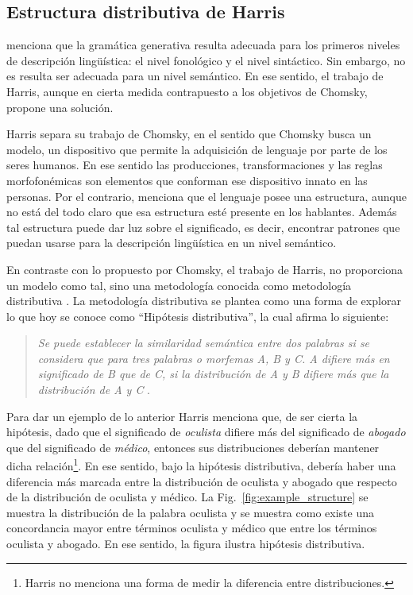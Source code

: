 \subsection{Estructura distributiva de Harris}

\cite{chomsky1997problemas} menciona que la gramática generativa resulta adecuada para los primeros niveles de descripción lingüística: el nivel fonológico y el nivel sintáctico. Sin embargo, no es resulta ser adecuada para un nivel semántico. En ese sentido, el trabajo de Harris, aunque en cierta medida contrapuesto a los objetivos de Chomsky, propone una solución.

Harris separa su trabajo de Chomsky, en el sentido que Chomsky busca un modelo, un dispositivo que permite la adquisición de lenguaje por parte de los seres humanos. En ese sentido las producciones, transformaciones y las reglas morfofonémicas son elementos que conforman ese dispositivo innato en las personas. Por el contrario, \cite{harris1954distributional} menciona que el lenguaje posee una estructura, aunque no está del todo claro que esa estructura esté presente en los hablantes. Además tal estructura puede dar luz sobre el significado, es decir, encontrar patrones que puedan usarse para la descripción lingüística en un nivel semántico.

En contraste con lo propuesto por Chomsky, el trabajo de Harris, no proporciona un modelo como tal, sino una metodología conocida como metodología distributiva \citep{sahlgren2008distributional}. La metodología distributiva se plantea como una forma de explorar lo que hoy se conoce como ``Hipótesis distributiva'', la cual afirma lo siguiente:

\begin{quote}
	\textit{Se puede establecer la similaridad semántica entre dos palabras si se considera que para tres palabras o morfemas A, B y C. A difiere más en significado de B que de C, si la distribución de A y B difiere más que la distribución de A y C} \citep{harris1954distributional}.
\end{quote}

Para dar un ejemplo de lo anterior Harris menciona que, de ser cierta la hipótesis, dado que el significado de \textit{oculista} difiere más del significado de \textit{abogado} que del significado de \textit{médico}, entonces sus distribuciones deberían mantener dicha relación\footnote{Harris no menciona una forma de medir la diferencia entre distribuciones.}. En ese sentido, bajo la hipótesis distributiva, debería haber una diferencia más marcada entre la distribución de oculista y abogado que respecto de la distribución de oculista y médico. La Fig.~\ref{fig:example_structure} se muestra la distribución de la palabra oculista y se muestra como existe una concordancia mayor entre términos oculista y médico que entre los términos oculista y abogado. En ese sentido, la figura ilustra hipótesis distributiva.

